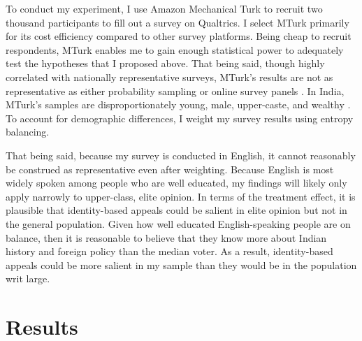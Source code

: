 \documentclass[12pt]{article}
\begin{document}
To conduct my experiment, I use Amazon Mechanical Turk to recruit two thousand participants to fill out a survey on Qualtrics. I select MTurk primarily for its cost efficiency compared to other survey platforms. Being cheap to recruit respondents, MTurk enables me to gain enough statistical power to adequately test the hypotheses that I proposed above. That being said, though highly correlated with nationally representative surveys, MTurk's results are not as representative as either probability sampling or online survey panels \citep{berinsky_evaluating_2012}. In India, MTurk's samples are disproportionately young, male, upper-caste, and wealthy \citep{boas_recruiting_2020}. To account for demographic differences, I weight my survey results using entropy balancing. 

That being said, because my survey is conducted in English, it cannot reasonably be construed as representative even after weighting. Because English is most widely spoken among people who are well educated, my findings will likely only apply narrowly to upper-class, elite opinion. In terms of the treatment effect, it is plausible that identity-based appeals could be salient in elite opinion but not in the general population. Given how well educated English-speaking people are on balance, then it is reasonable to believe that they know more about Indian history and foreign policy than the median voter. As a result, identity-based appeals could be more salient in my sample than they would be in the population writ large.

\section{Results}
\end{document}
